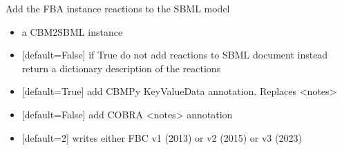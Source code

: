 \documentclass[letterpaper,10pt,english]{sphinxmanual}
\begin{document}

\begin{fulllineitems}
\label{\detokenize{modules_doc:cbmpy.CBXML.sbml_setReactionsL3Fbc}}
\pysigstartsignatures
{}
\pysigstopsignatures
\sphinxAtStartPar
Add the FBA instance reactions to the SBML model
\begin{itemize}
\item {} 
\sphinxAtStartPar
{} a CBM2SBML instance

\item {} 
\sphinxAtStartPar
{} {[}default=False{]} if True do not add reactions to SBML document instead return a dictionary description of the reactions

\item {} 
\sphinxAtStartPar
{} {[}default=True{]} add CBMPy KeyValueData annotation. Replaces \textless{}notes\textgreater{}

\item {} 
\sphinxAtStartPar
{} {[}default=False{]} add COBRA \textless{}notes\textgreater{} annotation

\item {} 
\sphinxAtStartPar
{} {[}default=2{]} writes either FBC v1 (2013) or v2 (2015) or v3 (2023)

\end{itemize}

\end{fulllineitems}

\end{document}
